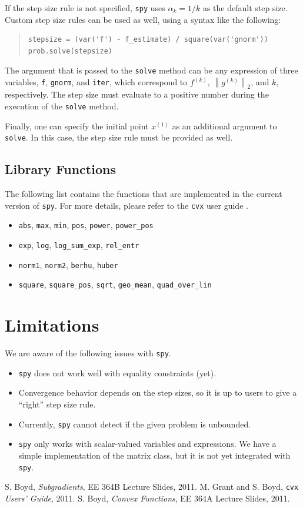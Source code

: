 \documentclass[12pt]{article}
\begin{document}
If the step size rule is not specified, \verb'spy' uses $\alpha_k = 1/k$ as the default step size. Custom step size rules can be used as well, using a syntax like the following:

\begin{quote}
\begin{verbatim}
stepsize = (var('f') - f_estimate) / square(var('gnorm'))
prob.solve(stepsize)
\end{verbatim}
\end{quote}

\noindent The argument that is passed to the \verb'solve' method can be any expression of three variables, \verb'f', \verb'gnorm', and \verb'iter', which correspond to $f^{(k)}$, $\left\|g^{(k)}\right\|_2$, and $k$, respectively. The step size must evaluate to a positive number during the execution of the \verb'solve' method.

Finally, one can specify the initial point $x^{(1)}$ as an additional argument to \verb'solve'. In this case, the step size rule must be provided as well.

\subsection{Library Functions}
\label{libfunctions}
The following list contains the functions that are implemented in the current version of \verb'spy'. For more details, please refer to the \verb'cvx' user guide \cite{guide}.
\begin{itemize}
\item \verb'abs', \verb'max', \verb'min', \verb'pos', \verb'power', \verb'power_pos'
\item \verb'exp', \verb'log', \verb'log_sum_exp', \verb'rel_entr'
\item \verb'norm1', \verb'norm2', \verb'berhu', \verb'huber'
\item \verb'square', \verb'square_pos', \verb'sqrt', \verb'geo_mean', \verb'quad_over_lin'
\end{itemize}

\section{Limitations}
We are aware of the following issues with \verb'spy'.
\begin{itemize}
\item \verb'spy' does not work well with equality constraints (yet).
\item Convergence behavior depends on the step sizes, so it is up to users to give a ``right'' step size rule.
\item Currently, \verb'spy' cannot detect if the given problem is unbounded.
\item \verb'spy' only works with scalar-valued variables and expressions. We have a simple implementation of the matrix class, but it is not yet integrated with \verb'spy'.
\end{itemize}


\begin{thebibliography}{99}
 S. Boyd, \emph{Subgradients}, EE 364B Lecture Slides, 2011.
 M. Grant and S. Boyd, \verb'cvx' \emph{Users' Guide}, 2011.
 S. Boyd, \emph{Convex Functions}, EE 364A Lecture Slides, 2011.
\end{thebibliography}
\end{document}
